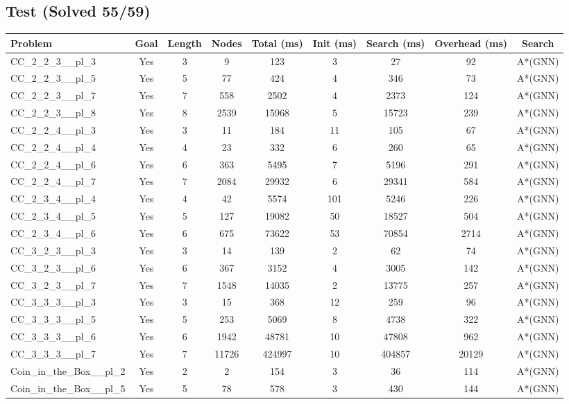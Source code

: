 \documentclass{article}
\begin{document}
\subsection*{Test (Solved 55/59)}
\begin{tabular}{lcccccccc}
\toprule
Problem & Goal & Length & Nodes & Total (ms) & Init (ms) & Search (ms) & Overhead (ms) & Search \\
\midrule
CC\_2\_2\_3\_\_pl\_3 & Yes & 3 & 9 & 123 & 3 & 27 & 92 & A*(GNN) \\
CC\_2\_2\_3\_\_pl\_5 & Yes & 5 & 77 & 424 & 4 & 346 & 73 & A*(GNN) \\
CC\_2\_2\_3\_\_pl\_7 & Yes & 7 & 558 & 2502 & 4 & 2373 & 124 & A*(GNN) \\
CC\_2\_2\_3\_\_pl\_8 & Yes & 8 & 2539 & 15968 & 5 & 15723 & 239 & A*(GNN) \\
CC\_2\_2\_4\_\_pl\_3 & Yes & 3 & 11 & 184 & 11 & 105 & 67 & A*(GNN) \\
CC\_2\_2\_4\_\_pl\_4 & Yes & 4 & 23 & 332 & 6 & 260 & 65 & A*(GNN) \\
CC\_2\_2\_4\_\_pl\_6 & Yes & 6 & 363 & 5495 & 7 & 5196 & 291 & A*(GNN) \\
CC\_2\_2\_4\_\_pl\_7 & Yes & 7 & 2084 & 29932 & 6 & 29341 & 584 & A*(GNN) \\
CC\_2\_3\_4\_\_pl\_4 & Yes & 4 & 42 & 5574 & 101 & 5246 & 226 & A*(GNN) \\
CC\_2\_3\_4\_\_pl\_5 & Yes & 5 & 127 & 19082 & 50 & 18527 & 504 & A*(GNN) \\
CC\_2\_3\_4\_\_pl\_6 & Yes & 6 & 675 & 73622 & 53 & 70854 & 2714 & A*(GNN) \\
CC\_3\_2\_3\_\_pl\_3 & Yes & 3 & 14 & 139 & 2 & 62 & 74 & A*(GNN) \\
CC\_3\_2\_3\_\_pl\_6 & Yes & 6 & 367 & 3152 & 4 & 3005 & 142 & A*(GNN) \\
CC\_3\_2\_3\_\_pl\_7 & Yes & 7 & 1548 & 14035 & 2 & 13775 & 257 & A*(GNN) \\
CC\_3\_3\_3\_\_pl\_3 & Yes & 3 & 15 & 368 & 12 & 259 & 96 & A*(GNN) \\
CC\_3\_3\_3\_\_pl\_5 & Yes & 5 & 253 & 5069 & 8 & 4738 & 322 & A*(GNN) \\
CC\_3\_3\_3\_\_pl\_6 & Yes & 6 & 1942 & 48781 & 10 & 47808 & 962 & A*(GNN) \\
CC\_3\_3\_3\_\_pl\_7 & Yes & 7 & 11726 & 424997 & 10 & 404857 & 20129 & A*(GNN) \\
Coin\_in\_the\_Box\_\_pl\_2 & Yes & 2 & 2 & 154 & 3 & 36 & 114 & A*(GNN) \\
Coin\_in\_the\_Box\_\_pl\_5 & Yes & 5 & 78 & 578 & 3 & 430 & 144 & A*(GNN) \\

\end{tabular}
\end{document}
